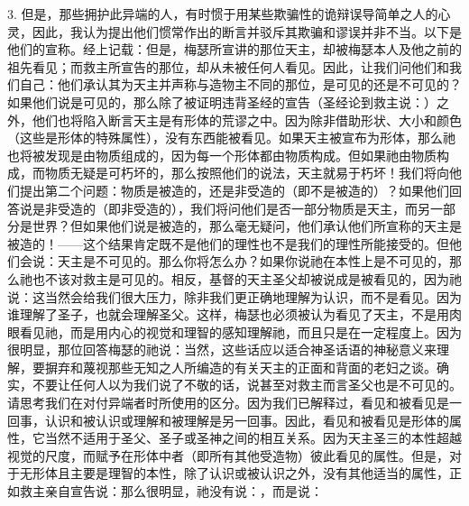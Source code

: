 3. 但是，那些拥护此异端的人，有时惯于用某些欺骗性的诡辩误导简单之人的心灵，因此，我认为提出他们惯常作出的断言并驳斥其欺骗和谬误并非不当。以下是他们的宣称。经上记载：但是，梅瑟所宣讲的那位天主，却被梅瑟本人及他之前的祖先看见；而救主所宣告的那位，却从未被任何人看见。因此，让我们问他们和我们自己：他们承认其为天主并声称与造物主不同的那位，是可见的还是不可见的？如果他们说是可见的，那么除了被证明违背圣经的宣告（圣经论到救主说：）之外，他们也将陷入断言天主是有形体的荒谬之中。因为除非借助形状、大小和颜色（这些是形体的特殊属性），没有东西能被看见。如果天主被宣布为形体，那么祂也将被发现是由物质组成的，因为每一个形体都由物质构成。但如果祂由物质构成，而物质无疑是可朽坏的，那么按照他们的说法，天主就易于朽坏！我们将向他们提出第二个问题：物质是被造的，还是非受造的（即不是被造的）？如果他们回答说是非受造的（即非受造的），我们将问他们是否一部分物质是天主，而另一部分是世界？但如果他们说是被造的，那么毫无疑问，他们承认他们所宣称的天主是被造的！——这个结果肯定既不是他们的理性也不是我们的理性所能接受的。但他们会说：天主是不可见的。那么你将怎么办？如果你说祂在本性上是不可见的，那么祂也不该对救主是可见的。相反，基督的天主圣父却被说成是被看见的，因为祂说：这当然会给我们很大压力，除非我们更正确地理解为认识，而不是看见。因为谁理解了圣子，也就会理解圣父。这样，梅瑟也必须被认为看见了天主，不是用肉眼看见祂，而是用内心的视觉和理智的感知理解祂，而且只是在一定程度上。因为很明显，那位回答梅瑟的祂说：当然，这些话应以适合神圣话语的神秘意义来理解，要摒弃和蔑视那些无知之人所编造的有关天主的正面和背面的老妇之谈。确实，不要让任何人以为我们说了不敬的话，说甚至对救主而言圣父也是不可见的。请思考我们在对付异端者时所使用的区分。因为我们已解释过，看见和被看见是一回事，认识和被认识或理解和被理解是另一回事。因此，看见和被看见是形体的属性，它当然不适用于圣父、圣子或圣神之间的相互关系。因为天主圣三的本性超越视觉的尺度，而赋予在形体中者（即所有其他受造物）彼此看见的属性。但是，对于无形体且主要是理智的本性，除了认识或被认识之外，没有其他适当的属性，正如救主亲自宣告说：那么很明显，祂没有说：，而是说：\par

